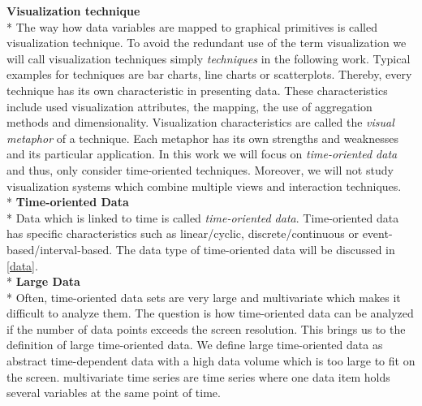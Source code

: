 \iffalse
Data Mining tools allow automatic decision-making by algorithms which are applied to the data and extract patterns in an automatic way\cite{Goebel1999}. Exploratory data analysis (EDA) tools are used to mine data with support of human input. We will use the definition of EDA tools if we speak of visualization tools in this work. As a pwc-survey showed eventhough automatic ways for decision support exist data analysis still relies on human judgement and thus\cite{PwC2016}, visualization tools are used to support the business user in the data discovery process. The main goal of visualization tools is the user support in gaining insights into the data. 
Visualization tools display hundreds of items on the screen and offer interaction techniques such as zooming and filtering\cite{Shneiderman2008}.
\fi
\textbf{Visualization technique}\\*
The way how data variables are mapped to graphical primitives is called visualization technique. To avoid the redundant use of the term visualization we will call visualization techniques simply \textit{techniques} in the following work. Typical examples for techniques are bar charts, line charts or scatterplots. Thereby, every technique has its own characteristic in presenting data. These characteristics include used visualization attributes, the mapping, the use of aggregation methods and dimensionality. Visualization characteristics are called the \textit{visual metaphor} of a technique\cite{Tegarden1999}. Each metaphor has its own strengths and weaknesses and its particular application. In this work we will focus on \textit{time-oriented data} and thus, only consider time-oriented techniques. Moreover, we will not study visualization systems which combine multiple views and interaction techniques.\\*
\textbf{Time-oriented Data}\\*
Data which is linked to time\cite{Aigner2011} is called \textit{time-oriented data}. Time-oriented data has specific characteristics such as linear/cyclic, discrete/continuous or event-based/interval-based. The data type of time-oriented data will be discussed in \ref{data}.\\*
\textbf{Large Data}\\*
Often, time-oriented data sets are very large and multivariate which makes it difficult to analyze them. The question is how time-oriented data can be analyzed if the number of data points exceeds the screen resolution. This brings us to the definition of large time-oriented data. 
We define large time-oriented data as abstract time-dependent data with a high data volume  which is too large to fit on the screen\cite{Shneiderman2008}. multivariate time series are time series where one data item holds several variables at the same point of time\cite{Aigner2011}.
